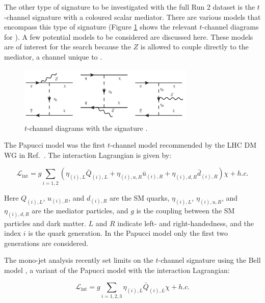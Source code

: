 The other type of signature to be investigated with the full Run 2 dataset is the $t$-channel signature with a coloured scalar mediator. There are various models that encompass this type of signature (Figure \ref{fig:tchan_bell} shows the relevant $t$-channel diagrams for \monoZ). A few potential models to be considered are discussed here. These models are of interest for the \monoZ search because the $Z$ is allowed to couple directly to the mediator, a channel unique to \monoZ.

\begin{figure}[!htb]
\centering
\includegraphics[width=0.75\textwidth]{Figures/tchan_bell.png}
\caption{$t$-channel diagrams with the \monoZ signature \cite{Bell:2012rg}.}
\label{fig:tchan_bell}
\end{figure}

The Papucci model \cite{Papucci:2014iwa} was the first $t$-channel model recommended by the LHC DM WG in Ref.\ \cite{Abercrombie:2015wmb}. The interaction Lagrangian is given by:

\begin{equation}
\mathcal{L}_\text{int} = g \sum_{i=1,2} \left( \eta_{(i),L} \bar{Q}_{(i),L} + \eta_{(i),u,R} \bar{u}_{(i),R} + \eta_{(i),d,R} \bar{d}_{(i),R} \right) \chi + h.c.
\end{equation}

\noindent Here $Q_{(i),L}$, $u_{(i),R}$, and $d_{(i),R}$ are the SM quarks, $\eta_{(i),L}$, $\eta_{(i),u,R}$, and $\eta_{(i),d,R}$ are the mediator particles, and $g$ is the coupling between the SM particles and dark matter. $L$ and $R$ indicate left- and right-handedness, and the index $i$ is the quark generation. In the Papucci model only the first two generations are considered. 

The mono-jet analysis recently set limits on the $t$-channel signature using the Bell model \cite{Bell:2012rg}, a variant of the Papucci model with the interaction Lagrangian:

\begin{equation}
\mathcal{L}_\text{int} = g \sum_{i=1,2,3} \eta_{(i),L} \bar{Q}_{(i),L} \chi + h.c.
\end{equation}

